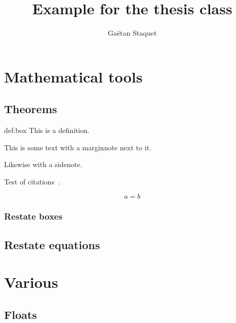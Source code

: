 \documentclass[
  b5paper,
  fontsize = 11pt,
  english,
  openany,
  twoside=false,
  roman equations,
]{thesis}
\title{Example for the thesis class}
\author{Gaëtan Staquet}
\begin{document}
  \frontmatter
  \maketitle

  \tableofcontents

  \mainmatter

  \chapter{Mathematical tools}

  \chapterTOC

  \section{Theorems}

  \begin{definition*}{def:box}
    This is a definition.
  \end{definition*}

  This is some text with a marginnote next to it.

  Likewise with a sidenote.

  Test of citations~.

  \begin{equation}
    a = b\label{eq:a:b}
  \end{equation}
  \marginnote{\aEqualb}

  \subsection{Restate boxes}


  \section{Restate equations}

  \chapter{Various}

  \section{Floats}
\end{document}
